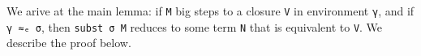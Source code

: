 We arive at the main lemma: if \texttt{M} big steps to a closure
\texttt{V} in environment \texttt{γ}, and if \texttt{γ\ ≈ₑ\ σ}, then
\texttt{subst\ σ\ M} reduces to some term \texttt{N} that is equivalent
to \texttt{V}. We describe the proof below.

\begin{fence}
\begin{code}%
\>[0]%
\>[514I]\AgdaSymbol{:}\AgdaSpace{}%
\AgdaSymbol{\}\{}\AgdaSpace{}%
\AgdaSymbol{:}\AgdaSpace{}%
\AgdaSpace{}%
\AgdaSymbol{\}\{}\AgdaSpace{}%
\AgdaSymbol{:}\AgdaSpace{}%
\AgdaSpace{}%
\AgdaSpace{}%
\AgdaSymbol{\}\{}\AgdaSpace{}%
\AgdaSymbol{:}\AgdaSpace{}%
\AgdaSpace{}%
\AgdaSpace{}%
\AgdaSymbol{\}\{}\AgdaSpace{}%
\AgdaSymbol{:}\AgdaSpace{}%
\AgdaSymbol{\}}\<%
\\
\>[.][@{}l@{}]\<[514I]%
\>[7]%
\>[529I]\AgdaSpace{}%
\AgdaSpace{}%
\AgdaSpace{}%
\AgdaSpace{}%
%
\>[20]%
\>[23]\AgdaSpace{}%
\AgdaSpace{}%
\<%
\\
\>[.][@{}l@{}]\<[529I]%
\>[9]\AgdaComment{---------------------------------------}\<%
\\
%
\>[7]\AgdaSpace{}%
\AgdaFunction{Σ[}\AgdaSpace{}%
\AgdaSpace{}%
\AgdaSpace{}%
\AgdaSpace{}%
\AgdaSpace{}%
\AgdaSpace{}%
\AgdaFunction{]}\AgdaSpace{}%
\AgdaSymbol{(}\AgdaSpace{}%
\AgdaSpace{}%
\AgdaSpace{}%
\AgdaSpace{}%
\AgdaSymbol{)}\AgdaSpace{}%
\AgdaSpace{}%
\AgdaSpace{}%
\AgdaSpace{}%
\<%
\\
\>[0]\AgdaSpace{}%
\AgdaSymbol{\{}\AgdaSpace{}%
\AgdaSymbol{=}\AgdaSpace{}%
\AgdaSymbol{\}}\AgdaSpace{}%
\AgdaSymbol{(}\AgdaSymbol{\{}\AgdaSpace{}%
\AgdaSymbol{=}\AgdaSpace{}%
\AgdaSymbol{\}}\AgdaSpace{}%
\AgdaSpace{}%
\AgdaSymbol{)}\AgdaSpace{}%

\end{code}
\end{fence}
